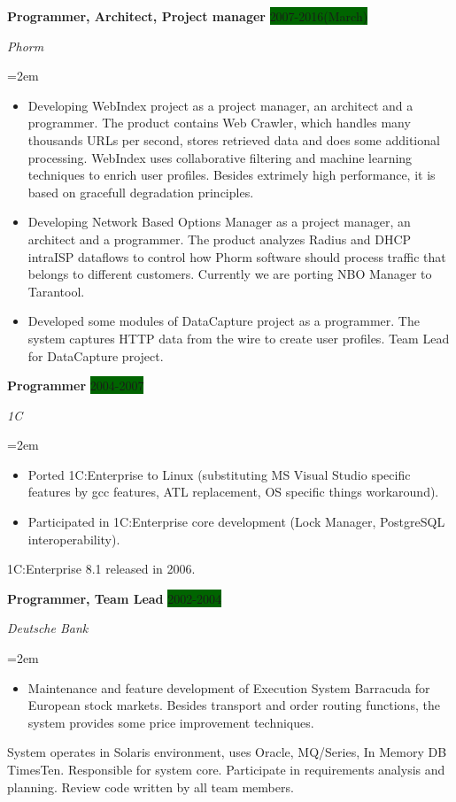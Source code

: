\documentclass[paper=a4,fontsize=10.5pt]{scrartcl} %
\newcommand{\sepspace}{\vspace*{1em}}       %
\newcommand{\EducationEntry}[4]{\pagebreak[2]
        \noindent \textbf{#1} \hfill      %
        \colorbox{DarkGreen}{%
            \hfill\color{White}#2} \par  %
        \noindent \textit{#3} \par        %
        \noindent\hangindent=2em\hangafter=0 \small #4 %
        \normalsize \par}
\newcommand{\WorkEntry}[4]{\pagebreak[2]    %
        \noindent \textbf{#1} \hfill      %
        \colorbox{DarkGreen}{\color{White}#2} \par  %
        \noindent \textit{#3} \par        %
        \noindent\hangindent=2em\hangafter=0 \small #4 %
        \normalsize \par         \sepspace}
\begin{document}
\WorkEntry{Programmer, Architect, Project manager}{2007-2016(March)}{Phorm}{
\begin{itemize}  \itemsep0em
\item  Developing WebIndex project as a project manager, an architect and a programmer. The product contains Web Crawler, which handles many thousands URLs per second, stores retrieved data and does some additional processing. WebIndex uses collaborative filtering and machine learning techniques to enrich user profiles. Besides extrimely high performance, it is based on gracefull degradation principles.
\item Developing Network Based Options Manager as a project manager, an architect and a programmer. The product analyzes Radius and DHCP intraISP dataflows to control how Phorm software should process traffic that belongs to different customers. Currently we are porting NBO Manager to Tarantool.
\item Developed some modules of DataCapture project as a programmer. The system captures HTTP data from the wire to create user profiles. Team Lead for DataCapture project.
\end{itemize}
}
\sepspace

\WorkEntry{Programmer}{2004-2007}{1C}{
\begin{itemize}\itemsep0em
\item Ported 1C:Enterprise to Linux (substituting MS Visual Studio specific features by gcc features, ATL replacement, OS specific things workaround).
\item Participated in 1C:Enterprise core development (Lock Manager, PostgreSQL interoperability).
\end{itemize}
1C:Enterprise 8.1 released in 2006.
}

\WorkEntry{Programmer, Team Lead}{2002-2004}{Deutsche Bank}{
\begin{itemize}\itemsep0em
\item  Maintenance and feature development of Execution System Barracuda for European stock markets. Besides transport and order routing functions, the system provides some price improvement techniques.
\end{itemize}
System operates in Solaris environment, uses Oracle, MQ/Series, In Memory DB TimesTen.
Responsible for system core.
Participate in requirements analysis and planning.
Review code written by all team members.
}
\end{document}
